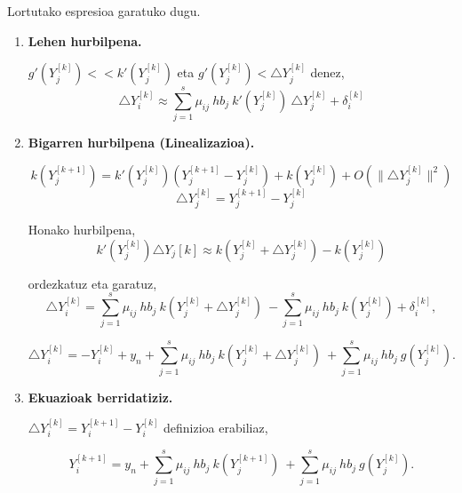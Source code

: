 Lortutako espresioa garatuko dugu.

\begin{enumerate}
\item \textbf{Lehen hurbilpena.}

$g'(Y_{j}^{[k]}) << k'(Y_{j}^{[k]})$  eta $g'(Y_{j}^{[k]})<\triangle Y_{j}^{[k]}$ denez,
\begin{equation}
\triangle Y_i^{[k]} \approx \sum\limits_{j=1}^{s} \mu_{ij} \ hb_j \ k'(Y_{j}^{[k]}) \ \triangle Y_j^{[k]}+\delta_i^{[k]}
\end{equation}  

\item \textbf{Bigarren hurbilpena (Linealizazioa).}

\begin{equation*}
k(Y_{j}^{[k+1]})=k'(Y_{j}^{[k]}) (Y_{j}^{[k+1]}-Y_{j}^{[k]})+k(Y_{j}^{[k]})+O(\|\triangle Y_j^{[k]}\|^2)
\end{equation*}
\begin{equation*}
\triangle Y_j^{[k]}=Y_j^{[k+1]}-Y_j^{[k]}
\end{equation*}

Honako hurbilpena,
\begin{equation*}
k'(Y_j^{[k]}) \triangle Y_j{[k]} \approx k(Y_j^{[k]}+\triangle Y_j^{[k]})- k(Y_j^{[k]})
\end{equation*}

ordezkatuz eta garatuz,
\begin{equation*}
\triangle Y_i^{[k]}=\sum\limits_{j=1}^{s} \mu_{ij} \ hb_j \ k(Y_j^{[k]}+\triangle Y_j^{[k]})\ -\sum\limits_{j=1}^{s} \mu_{ij} \ hb_j \ k(Y_j^{[k]}) +\delta_i^{[k]},
\end{equation*}

\begin{equation}
\triangle Y_i^{[k]}=-Y_i^{[k]}+y_n+ \sum\limits_{j=1}^{s} \mu_{ij} \ hb_j \ k(Y_j^{[k]}+\triangle Y_j^{[k]})\  +\sum\limits_{j=1}^{s} \mu_{ij} \ hb_j \ g(Y_{j}^{[k]}).
\end{equation}

\item \textbf{Ekuazioak berridatiziz.}

$\triangle Y_i^{[k]}=Y_i^{[k+1]}-Y_i^{[k]}$ definizioa erabiliaz,

\begin{equation}
Y_i^{[k+1]}=y_n+ \sum\limits_{j=1}^{s} \mu_{ij} \ hb_j \ k(Y_j^{[k+1]})\  +\sum\limits_{j=1}^{s} \mu_{ij} \ hb_j \ g(Y_{j}^{[k]}).
\end{equation}
\end{enumerate}


